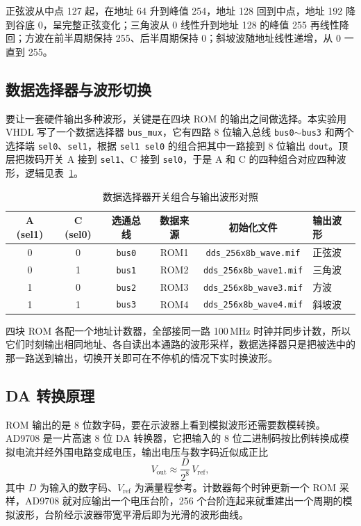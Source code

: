 \documentclass[12pt]{ctexart}
\begin{document}
正弦波从中点 127 起，在地址 64 升到峰值 254，地址 128 回到中点，地址 192 降到谷底 0，呈完整正弦变化；三角波从 0 线性升到地址 128 的峰值 255 再线性降回；方波在前半周期保持 255、后半周期保持 0；斜坡波随地址线性递增，从 0 一直到 255。

\subsection{数据选择器与波形切换}

要让一套硬件输出多种波形，关键是在四块 ROM 的输出之间做选择。本实验用 VHDL 写了一个数据选择器 \texttt{bus\_mux}，它有四路 8 位输入总线 \texttt{bus0}$\sim$\texttt{bus3} 和两个选择端 \texttt{sel0}、\texttt{sel1}，根据 \texttt{sel1 sel0} 的组合把其中一路接到 8 位输出 \texttt{dout}。顶层把拨码开关 A 接到 \texttt{sel1}、C 接到 \texttt{sel0}，于是 A 和 C 的四种组合对应四种波形，逻辑见表~\ref{tab:mux}。

\begin{table}[H]
    \centering
    \caption{数据选择器开关组合与输出波形对照}
    \label{tab:mux}
    \begin{tabular}{cccccl}
        \toprule
        \textbf{A (sel1)} & \textbf{C (sel0)} & \textbf{选通总线} & \textbf{数据来源} & \textbf{初始化文件} & \textbf{输出波形} \\
        \midrule
        0 & 0 & \texttt{bus0} & ROM1 & \texttt{dds\_256x8b\_wave.mif}  & 正弦波 \\
        0 & 1 & \texttt{bus1} & ROM2 & \texttt{dds\_256x8b\_wave1.mif} & 三角波 \\
        1 & 0 & \texttt{bus2} & ROM3 & \texttt{dds\_256x8b\_wave3.mif} & 方波 \\
        1 & 1 & \texttt{bus3} & ROM4 & \texttt{dds\_256x8b\_wave4.mif} & 斜坡波 \\
        \bottomrule
    \end{tabular}
\end{table}

四块 ROM 各配一个地址计数器，全部接同一路 100\,MHz 时钟并同步计数，所以它们时刻输出相同地址、各自读出本通路的波形采样，数据选择器只是把被选中的那一路送到输出，切换开关即可在不停机的情况下实时换波形。

\subsection{DA 转换原理}

ROM 输出的是 8 位数字码，要在示波器上看到模拟波形还需要数模转换。AD9708 是一片高速 8 位 DA 转换器，它把输入的 8 位二进制码按比例转换成模拟电流并经外围电路变成电压，输出电压与数字码近似成正比
\[
    V_{\text{out}} \approx \frac{D}{2^{8}} \, V_{\text{ref}},
\]
其中 $D$ 为输入的数字码、$V_{\text{ref}}$ 为满量程参考。计数器每个时钟更新一个 ROM 采样，AD9708 就对应输出一个电压台阶，256 个台阶连起来就重建出一个周期的模拟波形，台阶经示波器带宽平滑后即为光滑的波形曲线。
\end{document}
